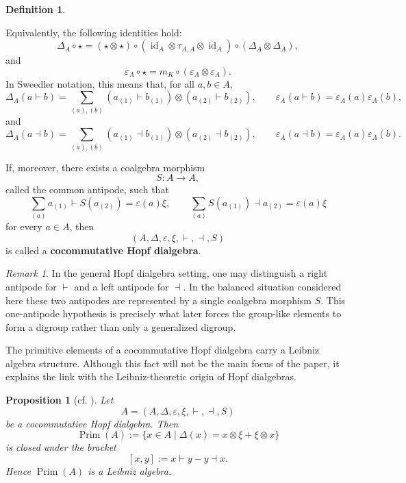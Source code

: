 \documentclass[11pt]{article}
\theoremstyle{plain}
\newtheorem{proposition}[theorem]{Proposition}
\theoremstyle{definition}
\newtheorem{definition}[theorem]{Definition}
\theoremstyle{remark}
\newtheorem{remark}[theorem]{Remark}
\newcommand{\id}{\operatorname{id}}
\DeclareMathOperator{\Prim}{Prim}
\begin{document}
\begin{definition}
\begin{enumerate}
			Equivalently, the following identities hold:
			\[
			\Delta_A\circ\star
			=
			(\star\otimes\star)
			\circ
			(\id_A\otimes\tau_{A,A}\otimes\id_A)
			\circ
			(\Delta_A\otimes\Delta_A),
			\]
			and
			\[
			\varepsilon_A\circ\star
			=
			m_K\circ(\varepsilon_A\otimes\varepsilon_A).
			\]
			In Sweedler notation, this means that, for all \(a,b\in A\),
			\[
			\Delta_A(a\vdash b)
			=
			\sum_{(a),(b)}
			(a_{(1)}\vdash b_{(1)})
			\otimes
			(a_{(2)}\vdash b_{(2)}),
			\qquad
			\varepsilon_A(a\vdash b)
			=
			\varepsilon_A(a)\varepsilon_A(b),
			\]
			and
			\[
			\Delta_A(a\dashv b)
			=
			\sum_{(a),(b)}
			(a_{(1)}\dashv b_{(1)})
			\otimes
			(a_{(2)}\dashv b_{(2)}),
			\qquad
			\varepsilon_A(a\dashv b)
			=
			\varepsilon_A(a)\varepsilon_A(b).
			\]
		\end{enumerate}
		
		If, moreover, there exists a coalgebra morphism
		\[
		S:A\longrightarrow A,
		\]
		called the common antipode, such that
		\[
		\sum_{(a)}a_{(1)}\vdash S(a_{(2)})=\varepsilon(a)\xi,
		\qquad
		\sum_{(a)}S(a_{(1)})\dashv a_{(2)}=\varepsilon(a)\xi
		\]
		for every \(a\in A\), then
		\[
		(A,\Delta,\varepsilon,\xi,\vdash,\dashv,S)
		\]
		is called a \textbf{cocommutative Hopf dialgebra}.
	\end{definition}
	
	\begin{remark}\label{rem:balanced-antipode}
		In the general Hopf dialgebra setting, one may distinguish a right antipode
		for \(\vdash\) and a left antipode for \(\dashv\). In the balanced situation
		considered here these two antipodes are represented by a single coalgebra
		morphism \(S\). This one-antipode hypothesis is precisely what later forces
		the group-like elements to form a digroup rather than only a generalized
		digroup.
	\end{remark}
	
	The primitive elements of a cocommutative Hopf dialgebra carry a Leibniz
	algebra structure. Although this fact will not be the main focus of the paper,
	it explains the link with the Leibniz-theoretic origin of Hopf dialgebras.
	
	\begin{proposition}[cf. {\cite[Proposition 2.2]{ABRW1}}]\label{prop:primitive-leibniz}
		Let
		\[
		A=(A,\Delta,\varepsilon,\xi,\vdash,\dashv,S)
		\]
		be a cocommutative Hopf dialgebra. Then
		\[
		\Prim(A):=\{x\in A\mid \Delta(x)=x\otimes\xi+\xi\otimes x\}
		\]
		is closed under the bracket
		\[
		[x,y]:=x\vdash y-y\dashv x.
		\]
		Hence \(\Prim(A)\) is a Leibniz algebra.
	\end{proposition}
	
\end{document}
